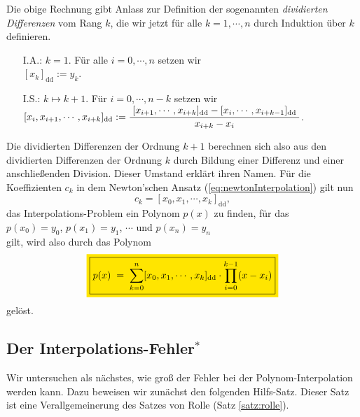 Die obige Rechnung gibt Anlass zur Definition der sogenannten 
\emph{dividierten Differenzen} vom Rang $k$, die wir jetzt f\"ur alle $k= 1,\cdots,n$ durch
Induktion \"uber  $k$ definieren.  
\begin{enumerate}
\item[I.A.:] $k=1$.  F\"ur alle $i=0,\cdots,n$ setzen wir 
             \\[0.2cm]
             \hspace*{1.3cm}
             $[x_k]_{\mathrm{dd}} := y_k$.
\item[I.S.:] $k\mapsto k+1$. F\"ur $i=0,\cdots,n-k$ setzen wir 
             \\[0.2cm]
             \hspace*{1.3cm}
             $[x_i,x_{i+1},\cdots,x_{i+k}]_{\mathrm{dd}} := \displaystyle\frac{\;\displaystyle[x_{i+1},\cdots,x_{i+k}]_{\mathrm{dd}} - [x_{i},\cdots,x_{i+k-1}]_{\mathrm{dd}}\;}{\;\displaystyle x_{i+k}-x_i\;}$.
\end{enumerate}
Die dividierten Differenzen der Ordnung $k+1$ berechnen sich also aus den dividierten
Differenzen der Ordnung $k$ durch Bildung einer Differenz und einer anschlie{\ss}enden
Division.  Dieser Umstand erkl\"art ihren Namen.  F\"ur die Koeffizienten $c_k$ in dem
Newton'schen Ansatz (\ref{eq:newtonInterpolation}) gilt nun 
\begin{equation}
  \label{eq:newtonInterpolationCk}
  c_k = [x_0,x_1,\cdots,x_k]_{\mathrm{dd}},
\end{equation}
das Interpolations-Problem ein Polynom $p(x)$ zu finden, f\"ur das
\\[0.2cm]
\hspace*{1.3cm}
$p(x_0) = y_0$, \quad
$p(x_1) = y_1$, \quad $\cdots$ \quad und \quad
$p(x_n) = y_n$
\\[0.2cm]
gilt, wird also durch das Polynom
\begin{equation}
  \label{eq:newtonInterpolationFinal}
\colorbox{orange}{\framebox{$\ds p(x) \; = \; \sum\limits_{k=0}^n [x_0,x_1,\cdots,x_k]_{\mathrm{dd}} \cdot  \prod\limits_{i=0}^{k-1}(x-x_i)$}}   
\end{equation}
gel\"ost.
\subsection{Der Interpolations-Fehler$^*$}
Wir untersuchen als n\"achstes, wie gro{\ss} der Fehler bei der Polynom-Interpolation werden
kann.  Dazu beweisen wir zun\"achst den folgenden Hilfs-Satz.  Dieser Satz ist eine Verallgemeinerung
des Satzes von Rolle (Satz \ref{satz:rolle}). 

